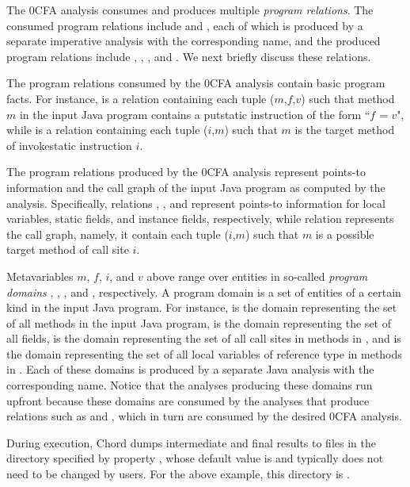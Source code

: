 The 0CFA analysis consumes and produces multiple {\it program relations}.
The consumed program relations include  and
, each of which is produced by a separate imperative analysis
with the corresponding name, and the produced program relations include
, , , and .  We next briefly discuss
these relations.

The program relations consumed by the 0CFA analysis contain basic program
facts.  For instance,  is a relation containing
each tuple ($m$,$f$,$v$) such that method $m$ in the input Java program
contains a putstatic instruction of the form ``$f$ = $v$", while
 is a relation containing each tuple ($i$,$m$) such that $m$
is the target method of invokestatic instruction $i$.

The program relations produced by the 0CFA analysis represent points-to
information and the call graph of the input Java program as computed by
the analysis.  Specifically, relations , , and 
represent points-to information for local variables, static fields, and
instance fields, respectively, while relation  represents the call
graph, namely, it contain each tuple ($i$,$m$) such that $m$ is a possible
target method of call site $i$.

Metavariables $m$, $f$, $i$, and $v$ above range over entities in so-called
{\it program domains} , , , and , respectively.
A program domain is a set of entities of a certain kind in the input Java
program.  For instance,  is the domain representing the set of all
methods in the input Java program,  is the domain representing the set
of all fields,  is the domain representing the set of all call sites
in methods in , and  is the domain representing the set of all
local variables of reference type in methods in .  Each of these
domains is produced by a separate Java analysis with the corresponding name.
Notice that the analyses producing these domains run upfront because these
domains are consumed by the analyses that produce relations such as
 and , which in turn are consumed by the
desired 0CFA analysis.

During execution, Chord dumps intermediate and final results to files in the
directory specified by property , whose default value is
 and typically does not need to be changed
by users.  For the above example, this directory is
.

